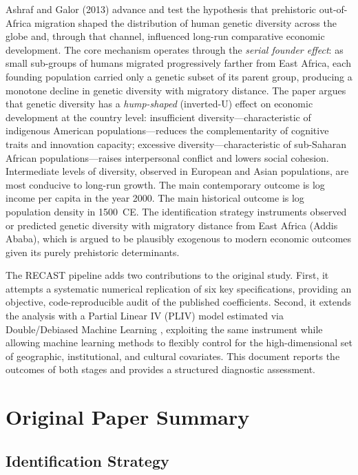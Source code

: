 \documentclass[12pt,letterpaper]{article}
\begin{document}
Ashraf and Galor (2013) advance and test the hypothesis that prehistoric
out-of-Africa migration shaped the distribution of human genetic diversity
across the globe and, through that channel, influenced long-run comparative
economic development.
The core mechanism operates through the \emph{serial founder effect}:
as small sub-groups of humans migrated progressively farther from East Africa,
each founding population carried only a genetic subset of its parent group,
producing a monotone decline in genetic diversity with migratory distance.
The paper argues that genetic diversity has a \emph{hump-shaped} (inverted-U)
effect on economic development at the country level:
insufficient diversity---characteristic of indigenous American populations---reduces
the complementarity of cognitive traits and innovation capacity;
excessive diversity---characteristic of sub-Saharan African populations---raises
interpersonal conflict and lowers social cohesion.
Intermediate levels of diversity, observed in European and Asian populations,
are most conducive to long-run growth.
The main contemporary outcome is log income per capita in the year 2000.
The main historical outcome is log population density in 1500~CE.
The identification strategy instruments observed or predicted genetic diversity with
migratory distance from East Africa (Addis Ababa), which is argued to be plausibly
exogenous to modern economic outcomes given its purely prehistoric determinants.

The RECAST pipeline adds two contributions to the original study.
First, it attempts a systematic numerical replication of six key specifications,
providing an objective, code-reproducible audit of the published coefficients.
Second, it extends the analysis with a Partial Linear IV (PLIV) model estimated
via Double/Debiased Machine Learning \cite{chernozhukov2018}, exploiting the
same instrument while allowing machine learning methods to flexibly control
for the high-dimensional set of geographic, institutional, and cultural covariates.
This document reports the outcomes of both stages and provides a structured
diagnostic assessment.

\section{Original Paper Summary}

\subsection{Identification Strategy}
\end{document}
